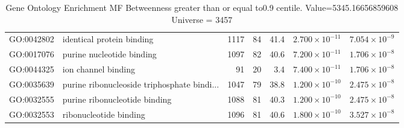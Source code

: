 \begin{table}[ht]
\begin{tabular}{llrrrrr}
  GO:0042802 & identical protein binding & 1117 & 84 & 41.4 & $2.700 \times 10^{-11}$ & $7.054 \times 10^{-9}$ \\ 
  GO:0017076 & purine nucleotide binding & 1097 & 82 & 40.6 & $7.200 \times 10^{-11}$ & $1.706 \times 10^{-8}$ \\ 
  GO:0044325 & ion channel binding & 91 & 20 & 3.4 & $7.400 \times 10^{-11}$ & $1.706 \times 10^{-8}$ \\ 
  GO:0035639 & purine ribonucleoside triphosphate bindi... & 1047 & 79 & 38.8 & $1.200 \times 10^{-10}$ & $2.475 \times 10^{-8}$ \\ 
  GO:0032555 & purine ribonucleotide binding & 1088 & 81 & 40.3 & $1.200 \times 10^{-10}$ & $2.475 \times 10^{-8}$ \\ 
  GO:0032553 & ribonucleotide binding & 1096 & 81 & 40.6 & $1.800 \times 10^{-10}$ & $3.527 \times 10^{-8}$ \\ 
   \hline
\end{tabular}
\caption{Gene Ontology Enrichment MF Betweenness  greater than or equal to0.9 centile.   Value=5345.16656859608 Universe = 3457} 
\label{tab:Gene Ontology Enrichment MF Betweenness  greater than or equal to0.9 centile.   Value=5345.16656859608 Universe = 3457}
\end{table}

